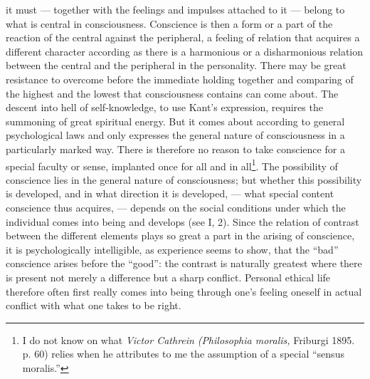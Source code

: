 \documentclass[12pt,a4paper,openany]{book}
\newcommand{\opage}[1]{\marginnote{\footnotesize\textit{[#1]}}}
\begin{document}
it must --- together with the feelings and impulses attached to it --- belong to what is central in
consciousness. Conscience is then a form or a part of the reaction of the central against the
peripheral, a feeling of relation that acquires a different character according as there is a
harmonious or a disharmonious relation between the central and the peripheral in the personality.
There may be great resistance to overcome before the immediate holding together and comparing of the
highest and the lowest that consciousness contains can come about. The descent into hell of
self-knowledge, to use Kant's expression, requires the summoning of great spiritual energy. But it
comes about according to general psychological laws and only expresses the general nature of
consciousness in a particularly marked way. There is therefore no reason to take conscience for a
special faculty or sense, implanted once for all and in all\footnote[1]{I do not know on what
\emph{Victor Cathrein} \textit{(Philosophia moralis,} Friburgi 1895. p. 60) relies when he attributes
to me the assumption of a special ``sensus moralis.''}. The possibility of conscience lies in the
general nature of consciousness; but whether this possibility is developed, and in what direction it
is developed, --- what special content conscience thus acquires, --- depends on the social conditions
under which the individual comes into being and develops (see I, 2). Since the relation of contrast
between the different elements plays so great a part in the arising of conscience, it is
psychologically intelligible, as experience seems to show, that the ``bad'' conscience arises before
the ``good'': the contrast is naturally
\opage{81}greatest where there is present not merely a difference but a sharp conflict. Personal ethical life
therefore often first really comes into being through one's feeling oneself in actual conflict with
what one takes to be right.
\end{document}
